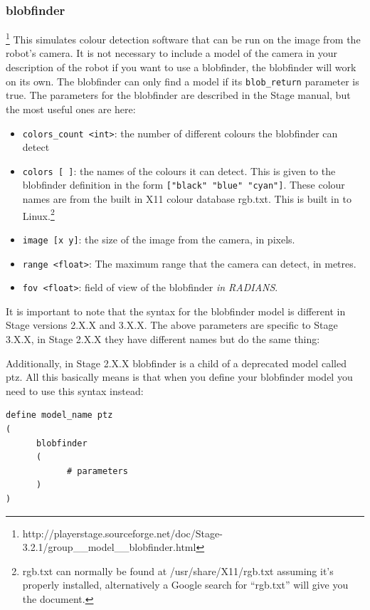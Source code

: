 \documentclass[a4paper]{report}
\begin{document}
\subsubsection{blobfinder}\footnote{http://playerstage.sourceforge.net/doc/Stage-3.2.1/group\_\_model\_\_blobfinder.html}
This simulates colour detection software that can be run on the image from the robot's camera. It is not necessary to include a model of the camera in your description of the robot if you want to use a blobfinder, the blobfinder will work on its own. The blobfinder can only find a model if its \verb|blob_return| parameter is true. The parameters for the blobfinder are described in the Stage manual, but the most useful ones are here:
\begin{itemize}
\item \verb|colors_count <int>|: the number of different colours the blobfinder can detect
\item \verb|colors [ ]|: the names of the colours it can detect. This is given to the blobfinder definition in the form \verb|["black" "blue" "cyan"]|. These colour names are from the built in X11 colour database rgb.txt. This is built in to Linux.\footnote{rgb.txt can normally be found at /usr/share/X11/rgb.txt assuming it's properly installed, alternatively a Google search for ``rgb.txt'' will give you the document.}
\item \verb|image [x y]|: the size of the image from the camera, in pixels.
\item \verb|range <float>|: The maximum range that the camera can detect, in metres.
\item \verb|fov <float>|: field of view of the blobfinder \emph{in RADIANS}.
\end{itemize}
It is important to note that the syntax for the blobfinder model is different in Stage versions 2.X.X and 3.X.X. The above parameters are specific to Stage 3.X.X, in Stage 2.X.X they have different names but do the same thing:
Additionally, in Stage 2.X.X blobfinder is a child of a deprecated model called ptz. All this basically means is that when you define your blobfinder model you need to use this syntax instead:
\begin{verbatim}
define model_name ptz
(
      blobfinder
      (
            # parameters
      )
)
\end{verbatim}
\end{document}
